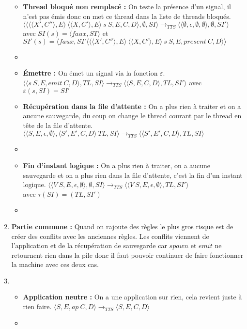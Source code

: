\documentclass[10pt,a4paper]{report}
\begin{document}
\begin{enumerate}
\begin{itemize}
  \item[] \textbf{Thread bloqué non remplacé :} On teste la présence d'un signal, il n'est pas émis donc on met ce thread dans la liste de threads bloqués.
    \smallbreak 
    $\langle\langle \langle\langle X',C''\rangle,E\rangle~\langle\langle X,C'\rangle,E\rangle~s~S,E,C,D\rangle,\emptyset,SI\rangle 
    \longrightarrow_{TTS} 
    \langle\langle \emptyset,\epsilon,\emptyset,\emptyset\rangle,\emptyset,SI'\rangle$
    \\avec $SI(s) = \langle faux,ST\rangle$
    et $SI'(s) = \langle faux,ST~\langle\langle\langle X',C''\rangle,E\rangle~\langle\langle X,C'\rangle,E\rangle~s~S,E,present~C,D\rangle\rangle$
  \item[]
    
  \item[] \textbf{Émettre :} On émet un signal via la fonction $\varepsilon$.
    \smallbreak 
    $\langle\langle s~S,E,emit~C,D\rangle,TL,SI\rangle 
    \longrightarrow_{TTS}
    \langle\langle S,E,C,D\rangle,TL,SI'\rangle$
    avec $\varepsilon(s,SI) = SI'$
    
  \item[] \textbf{Récupération dans la file d'attente :} On a plus rien à traiter et on a aucune sauvegarde, du coup on change le thread courant par le thread en tête de la file d'attente.
    \smallbreak
    $\langle\langle S,E,\epsilon,\emptyset\rangle,\langle S',E',C,D\rangle~TL,SI\rangle 
    \longrightarrow_{TTS} 
    \langle\langle S',E',C,D\rangle,TL,SI\rangle$
  \item[]
    
  \item[] \textbf{Fin d'instant logique :} On a plus rien à traiter, on a aucune sauvegarde et on a plus rien dans la file d'attente, c'est la fin d'un instant logique.
    \smallbreak
    $\langle\langle V~S,E,\epsilon,\emptyset \rangle ,\emptyset,SI\rangle 
    \longrightarrow_{TTS} 
    \langle\langle V~S,E,\epsilon,\emptyset\rangle,TL,SI'\rangle$
    \\avec $\tau(SI) = (TL,SI')$ 
  \item[]
    
  \end{itemize}
\item[] \textbf{Partie commune :} Quand on rajoute des règles le plus gros risque est de créer des conflits avec les anciennes règles. Les conflits viennent de l'application et de la récupération de sauvegarde car $spawn$ et $emit$ ne retournent rien dans la pile donc il faut pouvoir continuer de faire fonctionner la machine avec ces deux cas. 
\item[]
  \begin{itemize}
  \item[] \textbf{Application neutre :} On a une application sur rien, cela revient juste à rien faire.
    \smallbreak 
    $\langle S,E,ap~C,D\rangle
    \longrightarrow_{TTS} 
    \langle S,E,C,D\rangle$
  \item[]
    

\end{itemize}
\end{enumerate}
\end{document}
